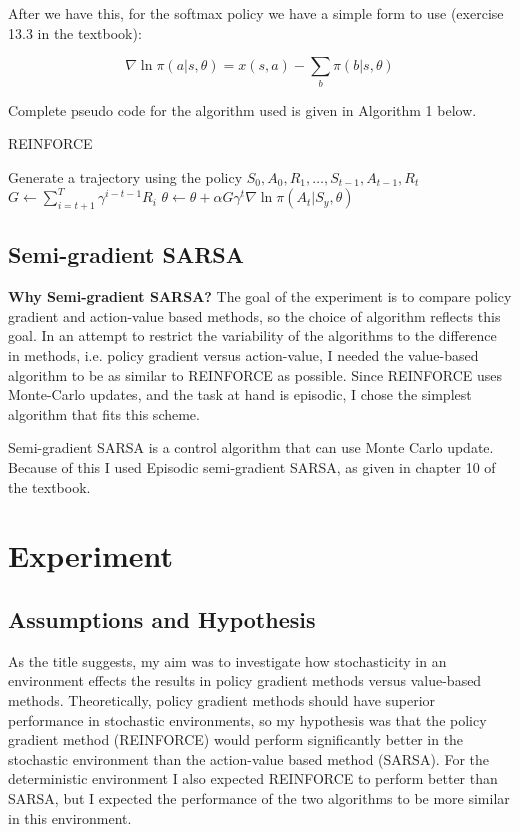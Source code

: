 \documentclass[10pt, letterpaper, twocolumn]{article}
\begin{document}
	After we have this, for the softmax policy we have a simple form to use (exercise 13.3 in the textbook):
	
	$$\nabla\ln\pi(a|s,\theta) = x(s,a) - \sum_{b}\pi(b|s, \theta)$$
	
	Complete pseudo code for the algorithm used is given in Algorithm 1 below.
	
	
	\begin{algorithm}
		
		\caption{REINFORCE}
		\begin{algorithmic}
			\STATE Generate a trajectory using the policy $S_0, A_0, R_1,\ldots, S_{t-1}, A_{t-1}, R_t$
			\FOR{each step t [0, T)}
			\STATE $G \leftarrow \sum_{i=t+1}^{T} \gamma^{i-t-1} R_i$
			\STATE $\theta \leftarrow \theta + \alpha G \gamma^{t} \nabla\ln\pi(A_t|S_y, \theta)$
			\ENDFOR
			\ENDFOR
		\end{algorithmic}
	\end{algorithm}
	
	\subsection{Semi-gradient SARSA}
	
	\noindent \textbf{Why Semi-gradient SARSA?} The goal of the experiment is to compare policy gradient and action-value based methods, so the choice of algorithm reflects this goal. In an attempt to restrict the variability of the algorithms to the difference in methods, i.e. policy gradient versus action-value, I needed the value-based algorithm to be as similar to REINFORCE as possible. Since REINFORCE uses Monte-Carlo updates, and the task at hand is episodic, I chose the simplest algorithm that fits this scheme. 
	
	Semi-gradient SARSA is a control algorithm that can use Monte Carlo update. Because of this I used Episodic semi-gradient SARSA, as given in chapter 10 of the textbook.
	
	\section{Experiment}
	
	\subsection{Assumptions and Hypothesis}
	
	\noindent As the title suggests, my aim was to investigate how stochasticity in an environment effects the results in policy gradient methods versus value-based methods. Theoretically, policy gradient methods should have superior performance in stochastic environments, so my hypothesis was that the policy gradient method (REINFORCE) would perform significantly better in the stochastic environment than the action-value based method (SARSA). For the deterministic environment I also expected REINFORCE to perform better than SARSA, but I expected the performance of the two algorithms to be more similar in this environment.\\
	
\end{document}
